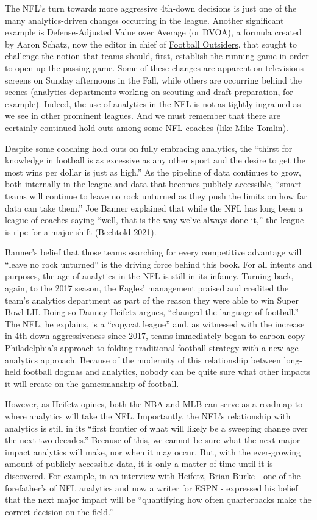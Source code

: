 \documentclass[
  letterpaper,
]{krantz}
\begin{document}
The NFL's turn towards more aggressive 4th-down decisions is just one of
the many analytics-driven changes occurring in the league. Another
significant example is Defense-Adjusted Value over Average (or DVOA), a
formula created by Aaron Schatz, now the editor in chief of
\href{https://www.footballoutsiders.com/info/methods\#dvoa}{Football
Outsiders}, that sought to challenge the notion that teams should,
first, establish the running game in order to open up the passing game.
Some of these changes are apparent on televisions screens on Sunday
afternoons in the Fall, while others are occurring behind the scenes
(analytics departments working on scouting and draft preparation, for
example). Indeed, the use of analytics in the NFL is not as tightly
ingrained as we see in other prominent leagues. And we must remember
that there are certainly continued hold outs among some NFL coaches
(like Mike Tomlin).

Despite some coaching hold outs on fully embracing analytics, the
``thirst for knowledge in football is as excessive as any other sport
and the desire to get the most wins per dollar is just as high.'' As the
pipeline of data continues to grow, both internally in the league and
data that becomes publicly accessible, ``smart teams will continue to
leave no rock unturned as they push the limits on how far data can take
them.'' Joe Banner explained that while the NFL has long been a league
of coaches saying ``well, that is the way we've always done it,'' the
league is ripe for a major shift (Bechtold 2021).

Banner's belief that those teams searching for every competitive
advantage will ``leave no rock unturned'' is the driving force behind
this book. For all intents and purposes, the age of analytics in the NFL
is still in its infancy. Turning back, again, to the 2017 season, the
Eagles' management praised and credited the team's analytics department
as part of the reason they were able to win Super Bowl LII. Doing so
Danney Heifetz argues, ``changed the language of football.'' The NFL, he
explains, is a ``copycat league'' and, as witnessed with the increase in
4th down aggressiveness since 2017, teams immediately began to carbon
copy Philadelphia's approach to folding traditional football strategy
with a new age analytics approach. Because of the modernity of this
relationship between long-held football dogmas and analytics, nobody can
be quite sure what other impacts it will create on the gamesmanship of
football.

However, as Heifetz opines, both the NBA and MLB can serve as a roadmap
to where analytics will take the NFL. Importantly, the NFL's
relationship with analytics is still in its ``first frontier of what
will likely be a sweeping change over the next two decades.'' Because of
this, we cannot be sure what the next major impact analytics will make,
nor when it may occur. But, with the ever-growing amount of publicly
accessible data, it is only a matter of time until it is discovered. For
example, in an interview with Heifetz, Brian Burke - one of the
forefather's of NFL analytics and now a writer for ESPN - expressed his
belief that the next major impact will be ``quantifying how often
quarterbacks make the correct decision on the field.''
\end{document}
